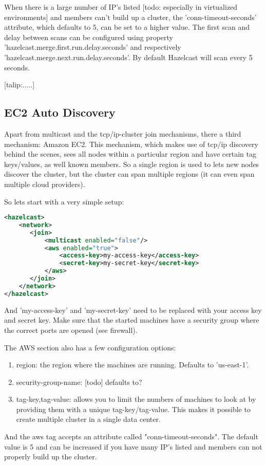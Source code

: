 When there is a large number of IP's listed [todo: especially in virtualized environments] and members can't build up a cluster, the 'conn-timeout-seconds' attribute, which defaults to 5, can be set to a higher value. The first scan and delay between scans can be configured using property 'hazelcast.merge.first.run.delay.seconds' and respectively 'hazelcast.merge.next.run.delay.seconds'. By default Hazelcast will scan every 5 seconds.

[talip:.....]

\subsection{EC2 Auto Discovery}
Apart from multicast and the tcp/ip-cluster join mechanisms, there a third mechanism: Amazon EC2. This mechanism, which makes use of tcp/ip discovery behind the scenes, sees all nodes within a particular region and have certain tag keys/values, as well known members. So a single region is used to lets new nodes discover the cluster, but the cluster can span multiple regions (it can even span multiple cloud providers).

So lets start with a very simple setup:
\begin{lstlisting}[language=xml]
<hazelcast>
    <network>
       <join>
           <multicast enabled="false"/>
           <aws enabled="true">
               <access-key>my-access-key</access-key>
               <secret-key>my-secret-key</secret-key>
           </aws>
       </join>
    </network>
</hazelcast>
\end{lstlisting}
And 'my-access-key' and 'my-secret-key' need to be replaced with your access key and secret key. Make sure that the started machines have a security group where the correct ports are opened (see firewall).

The AWS section also has a few configuration options:
\begin{enumerate}
\item region: the region where the machines are running. Defaults to 'us-east-1'.
\item security-group-name: [todo] defaults to?
\item tag-key,tag-value: allows you to limit the numbers of machines to look at by providing them with a unique tag-key/tag-value. This makes it possible to create multiple cluster in a single data center.
\end{enumerate}
And the aws tag accepts an attribute called "conn-timeout-seconds". The default value is 5 and can be increased  if you have many IP's listed and members can not properly build up the cluster.

